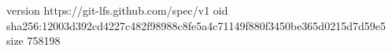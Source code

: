 version https://git-lfs.github.com/spec/v1
oid sha256:12003d392cd4227c482f98988c8fe5a4c71149f880f3450be365d0215d7d59e5
size 758198
